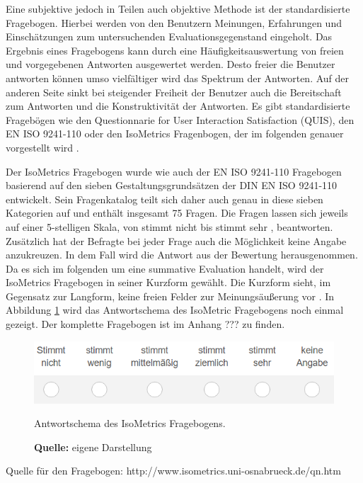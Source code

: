 Eine subjektive jedoch in Teilen auch objektive Methode ist der standardisierte Fragebogen. Hierbei werden von den Benutzern Meinungen, Erfahrungen und Einschätzungen zum untersuchenden Evaluationsgegenstand eingeholt. Das Ergebnis eines Fragebogens kann durch eine Häufigkeitsauswertung von freien und vorgegebenen Antworten ausgewertet werden. Desto freier die Benutzer antworten können umso vielfältiger wird das Spektrum der Antworten. Auf der anderen Seite sinkt bei steigender Freiheit der Benutzer auch die Bereitschaft zum Antworten und die Konstruktivität der Antworten. Es gibt standardisierte Fragebögen wie den Questionnarie for User Interaction Satisfaction (QUIS), den EN ISO 9241-110 oder den IsoMetrics Fragenbogen, der im folgenden genauer vorgestellt wird \citep[vgl.][Kap. 4.5.1.1]{Hegner2003}.

Der IsoMetrics Fragebogen wurde wie auch der EN ISO 9241-110 Fragebogen basierend auf den sieben Gestaltungsgrundsätzen der DIN EN ISO 9241-110 entwickelt. Sein Fragenkatalog teilt sich daher auch genau in diese sieben Kategorien auf und enthält insgesamt 75 Fragen. Die Fragen lassen sich jeweils auf einer 5-stelligen Skala, von \glqq stimmt nicht \grqq{} bis \glqq stimmt sehr \grqq{}, beantworten. Zusätzlich hat der Befragte bei jeder Frage auch die Möglichkeit \glqq keine Angabe \grqq{} anzukreuzen. In dem Fall wird die Antwort aus der Bewertung herausgenommen. Da es sich im folgenden um eine summative Evaluation handelt, wird der IsoMetrics Fragebogen in seiner Kurzform gewählt. Die Kurzform sieht, im Gegensatz zur Langform, keine freien Felder zur Meinungsäußerung vor \citep[vgl.][Kap. 3.4]{Figl2010}. In Abbildung \ref{fig:isoMetricAntwortschema} wird das Antwortschema des IsoMetric Fragebogens noch einmal gezeigt. Der komplette Fragebogen ist im Anhang ??? zu finden.
\begin{figure}[H]
  \centering
  \includegraphics[scale=0.8]{img/IsoMetricAntwortschema.PNG}
  \caption{Antwortschema des IsoMetrics Fragebogens.}
  \caption*{\textbf{Quelle:} eigene Darstellung}
  \label{fig:isoMetricAntwortschema}
\end{figure}


Quelle für den Fragebogen: http://www.isometrics.uni-osnabrueck.de/qn.htm

